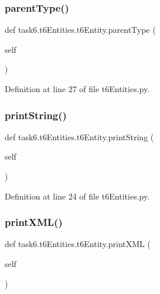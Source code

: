 \subsubsection{\texorpdfstring{parent\+Type()}{parentType()}}
{\footnotesize\ttfamily def task6.\+t6\+Entities.\+t6\+Entity.\+parent\+Type (\begin{DoxyParamCaption}\item[{}]{self }\end{DoxyParamCaption})}



Definition at line 27 of file t6\+Entities.\+py.

\mbox{\label{classtask6_1_1t6Entities_1_1t6Entity_ae24a589eee8e89e5cc9d2116a05f574c}} 
\subsubsection{\texorpdfstring{print\+String()}{printString()}}
{\footnotesize\ttfamily def task6.\+t6\+Entities.\+t6\+Entity.\+print\+String (\begin{DoxyParamCaption}\item[{}]{self }\end{DoxyParamCaption})}



Definition at line 24 of file t6\+Entities.\+py.

\mbox{\label{classtask6_1_1t6Entities_1_1t6Entity_acd1af6b899f68fec07c9749e5d0129fa}} 
\subsubsection{\texorpdfstring{print\+X\+M\+L()}{printXML()}}
{\footnotesize\ttfamily def task6.\+t6\+Entities.\+t6\+Entity.\+print\+X\+ML (\begin{DoxyParamCaption}\item[{}]{self }\end{DoxyParamCaption})}



